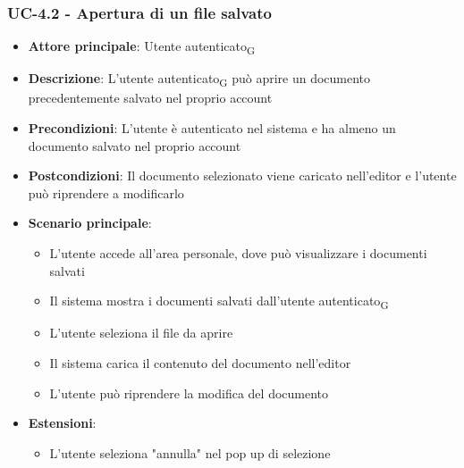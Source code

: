 \documentclass[11pt,a4paper]{article}
\newcommand{\gls}[1]{#1\textsubscript{G}}
\begin{document}
\subsubsection{UC-4.2 - Apertura di un file salvato}
\begin{itemize}
    \item \textbf{Attore principale}: \gls{Utente autenticato}
    \item \textbf{Descrizione}: L'\gls{utente autenticato} può aprire un documento precedentemente salvato nel proprio account
    \item \textbf{Precondizioni}: L'utente è autenticato nel sistema e ha almeno un documento salvato nel proprio account
    \item \textbf{Postcondizioni}: Il documento selezionato viene caricato 
    nell'editor e l'utente può riprendere a modificarlo
    \item \textbf{Scenario principale}:
        \begin{itemize}
            \item L'utente accede all'area personale, dove può visualizzare i documenti salvati
            \item Il sistema mostra i documenti salvati dall'\gls{utente autenticato}
            \item L'utente seleziona il file da aprire
            \item Il sistema carica il contenuto del documento nell'editor
            \item L'utente può riprendere la modifica del documento
        \end{itemize}
    \item \textbf{Estensioni}:
        \begin{itemize}
            \item L'utente seleziona "annulla" nel pop up di selezione
        \end{itemize}
\end{itemize}
\end{document}
